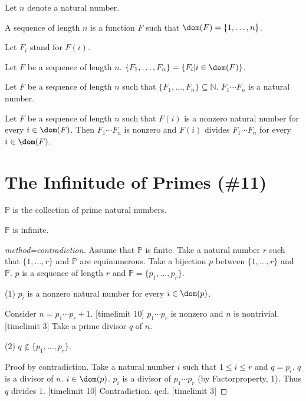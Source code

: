 \documentclass{article}
\newcommand{\Prod}[3]{#1_{#2} \cdots #1_{#3}}
\newcommand{\Seq}[2]{\{#1,\dots,#2\}}
\newcommand{\FinSet}[3]{\{#1_{#2},\dots,#1_{#3}\}}
\newcommand{\Primes}{\mathbb{P}}
\begin{document}
\begin{forthel}
  Let $n$ denote a natural number.

\begin{definition}
A sequence of length $n$ is a
function $F$ such that $\dom(F) = \Seq{1}{n}$.
\end{definition}

Let $F_{i}$ stand for $F(i)$.

\begin{definition}
Let $F$ be a sequence of length $n$.
$\FinSet{F}{1}{n} = \{ F_{i} | i \in \dom(F)\}$.
\end{definition}





\begin{signature}
Let $F$ be a sequence of length $n$
such that $\FinSet{F}{1}{n} \subseteq \mathbb{N}$.
$\Prod{F}{1}{n}$ is a natural number.
\end{signature}

\begin{axiom}[title=Factorproperty]
Let $F$ be a sequence of length $n$
such that $F(i)$ is a nonzero natural number for every $i \in \dom(F)$.
Then $\Prod{F}{1}{n}$ is nonzero and
$F(i)$ divides $\Prod{F}{1}{n}$ for every $i \in \dom(F)$.
\end{axiom}

\end{forthel}

\section{The Infinitude of Primes (\#11)}

\begin{forthel}

\begin{signature}
$\Primes$ is the collection of prime natural numbers.
\end{signature}

\begin{theorem}[title=Euclid]
$\Primes$ is infinite.
\end{theorem}
\begin{proof}[method=contradiction]
Assume that $\Primes$ is finite.
Take a natural number $r$ such that $\Seq{1}{r}$ and $\Primes$ are equinumerous.
Take a bijection $p$ between $\Seq{1}{r}$ and $\Primes$.
$p$ is a sequence of length $r$ and
$\Primes = \FinSet{p}{1}{r}$.

(1) $p_{i}$ is a nonzero natural number for every
$i \in  \dom(p)$.

Consider $n = \Prod{p}{1}{r}+1$. [timelimit 10]
$\Prod{p}{1}{r}$ is nonzero and $n$ is nontrivial. [timelimit 3]
Take a prime divisor $q$ of $n$.

(2) $q \notin \FinSet{p}{1}{r}$.

Proof by contradiction.
Take a natural number $i$ such that $1 \leq i \leq r$
and $q=p_{i}$.
$q$ is a divisor of $n$.
$i \in \dom(p)$.
$p_{i}$ is a divisor of $\Prod{p}{1}{r}$
(by Factorproperty, 1).
Thus $q$ divides $1$. [timelimit 10]
Contradiction. qed.
[timelimit 3]
\end{proof}
\end{forthel}

\printbibliography
\end{document}
